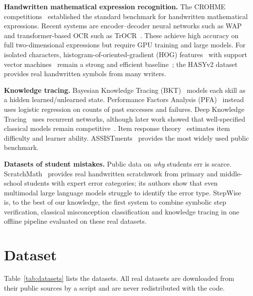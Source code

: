 \documentclass[runningheads]{llncs}
\begin{document}
\textbf{Handwritten mathematical expression recognition.} The CROHME competitions~\cite{mouchere2014,mahdavi2019} established the standard benchmark for handwritten mathematical expressions. Recent systems are encoder--decoder neural networks such as WAP~\cite{zhang2017wap} and transformer-based OCR such as TrOCR~\cite{li2023trocr}. These achieve high accuracy on full two-dimensional expressions but require GPU training and large models. For isolated characters, histogram-of-oriented-gradient (HOG) features~\cite{dalal2005} with support vector machines~\cite{cortes1995} remain a strong and efficient baseline~\cite{maji2009}; the HASYv2 dataset~\cite{thoma2017} provides real handwritten symbols from many writers.

\textbf{Knowledge tracing.} Bayesian Knowledge Tracing (BKT)~\cite{corbett1994} models each skill as a hidden learned/unlearned state. Performance Factors Analysis (PFA)~\cite{pavlik2009} instead uses logistic regression on counts of past successes and failures. Deep Knowledge Tracing~\cite{piech2015} uses recurrent networks, although later work showed that well-specified classical models remain competitive~\cite{xiong2016}. Item response theory~\cite{rasch1960} estimates item difficulty and learner ability. ASSISTments~\cite{feng2009} provides the most widely used public benchmark.

\textbf{Datasets of student mistakes.} Public data on \emph{why} students err is scarce. ScratchMath~\cite{song2026scratchmath} provides real handwritten scratchwork from primary and middle-school students with expert error categories; its authors show that even multimodal large language models struggle to identify the error type. StepWise is, to the best of our knowledge, the first system to combine symbolic step verification, classical misconception classification and knowledge tracing in one offline pipeline evaluated on these real datasets.

\section{Dataset}

Table~\ref{tab:datasets} lists the datasets. All real datasets are downloaded from their public sources by a script and are never redistributed with the code.
\end{document}
